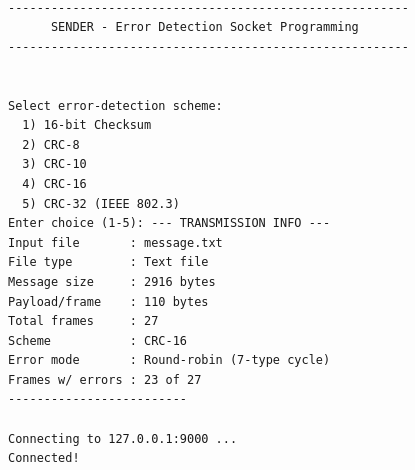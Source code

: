\documentclass[12pt, a4paper]{article}
\begin{document}
\begin{scriptsize}
\begin{verbatim}

--------------------------------------------------------
      SENDER - Error Detection Socket Programming       
--------------------------------------------------------


Select error-detection scheme:
  1) 16-bit Checksum
  2) CRC-8
  3) CRC-10
  4) CRC-16
  5) CRC-32 (IEEE 802.3)
Enter choice (1-5): --- TRANSMISSION INFO ---
Input file       : message.txt
File type        : Text file
Message size     : 2916 bytes
Payload/frame    : 110 bytes
Total frames     : 27
Scheme           : CRC-16
Error mode       : Round-robin (7-type cycle)
Frames w/ errors : 23 of 27
-------------------------

Connecting to 127.0.0.1:9000 ...
Connected!


\end{verbatim}
\end{scriptsize}
\end{document}
